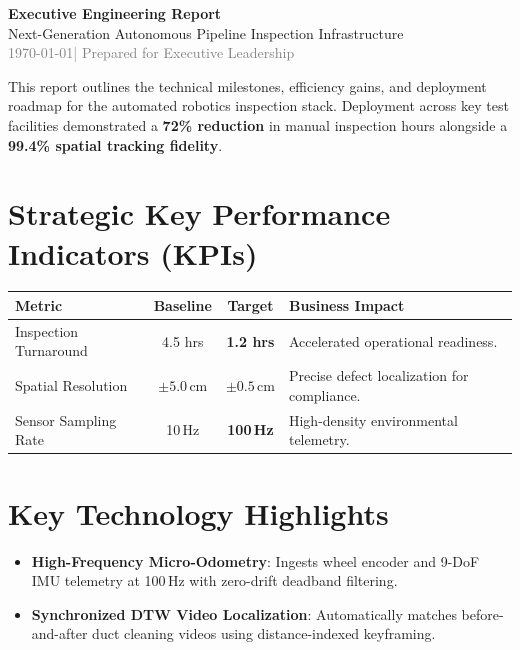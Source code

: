 \documentclass[11pt,a4paper]{article}
\begin{document}
\begin{center}
    {\huge\bfseries\color{corpnavy} Executive Engineering Report} \\[0.3cm]
    {\large Next-Generation Autonomous Pipeline Inspection Infrastructure} \\[0.2cm]
    \textcolor{gray}{\today \quad | \quad Prepared for Executive Leadership}
\end{center}

\vspace{0.4cm}

\begin{tcolorbox}[colback=boxbg, colframe=corpteal, title=\textbf{Executive Summary}]
This report outlines the technical milestones, efficiency gains, and deployment roadmap for the automated robotics inspection stack. Deployment across key test facilities demonstrated a \textbf{72\% reduction} in manual inspection hours alongside a \textbf{99.4\% spatial tracking fidelity}.
\end{tcolorbox}

\section{Strategic Key Performance Indicators (KPIs)}
\begin{center}
\renewcommand{\arraystretch}{1.3}
\begin{tabularx}{\textwidth}{l c c X}
\toprule
\textbf{Metric} & \textbf{Baseline} & \textbf{Target} & \textbf{Business Impact} \\
\midrule
Inspection Turnaround & 4.5 hrs & \textbf{1.2 hrs} & Accelerated operational readiness. \\
Spatial Resolution & $\pm 5.0\,\text{cm}$ & \textbf{$\pm 0.5\,\text{cm}$} & Precise defect localization for compliance. \\
Sensor Sampling Rate & 10\,Hz & \textbf{100\,Hz} & High-density environmental telemetry. \\
\bottomrule
\end{tabularx}
\end{center}

\section{Key Technology Highlights}
\begin{itemize}
    \item \textbf{High-Frequency Micro-Odometry}: Ingests wheel encoder and 9-DoF IMU telemetry at 100\,Hz with zero-drift deadband filtering.
    \item \textbf{Synchronized DTW Video Localization}: Automatically matches before-and-after duct cleaning videos using distance-indexed keyframing.
\end{itemize}
\end{document}
